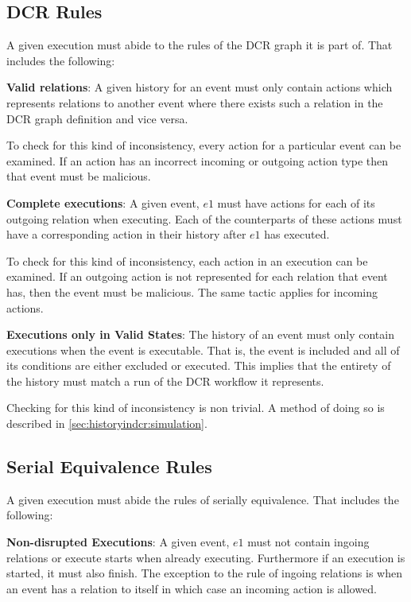	\subsection{DCR Rules}
	A given execution must abide to the rules of the DCR graph it is part of. That includes the following:
	
	\newpar \textbf{Valid relations}: A given history for an event must only contain actions which represents relations to another event where there exists such a relation in the DCR graph definition and vice versa. 
	
	To check for this kind of inconsistency, every action for a particular event can be examined. If an action has an incorrect incoming or outgoing action type then that event must be malicious. 
	
	\newpar \textbf{Complete executions}: A given event, $e1$ must have actions for each of its outgoing relation when executing. Each of the counterparts of these actions must have a corresponding action in their history after $e1$ has executed.
	
	To check for this kind of inconsistency, each action in an execution can be examined. If an outgoing action is not represented for each relation that event has, then the event must be malicious. The same tactic applies for incoming actions.
	
	\newpar \textbf{Executions only in Valid States}: The history of an event must only contain executions when the event is executable. That is, the event is included and all of its conditions are either excluded or executed. This implies that the entirety of the history must match a run of the DCR workflow it represents.
	
	Checking for this kind of inconsistency is non trivial. A method of doing so is described in \autoref{sec:historyindcr:simulation}.
	
	\subsection{Serial Equivalence Rules}
	A given execution must abide the rules of serially equivalence. That includes the following:
	
	\newpar \textbf{Non-disrupted Executions}: A given event, $e1$ must not contain ingoing relations or execute starts when already executing. Furthermore if an execution is started, it must also finish. The exception to the rule of ingoing relations is when an event has a relation to itself in which case an incoming action is allowed.
	
